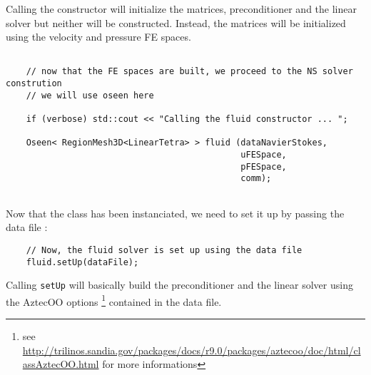 Calling the constructor will initialize the matrices, preconditioner and the linear solver
but neither will be constructed. Instead, the matrices will be initialized using the
velocity and pressure FE spaces.

\begin{verbatim}

    // now that the FE spaces are built, we proceed to the NS solver constrution
    // we will use oseen here

    if (verbose) std::cout << "Calling the fluid constructor ... ";

    Oseen< RegionMesh3D<LinearTetra> > fluid (dataNavierStokes,
                                              uFESpace,
                                              pFESpace,
                                              comm);


\end{verbatim}

Now that the class has been instanciated, we need to set it up by passing the data file :

\begin{verbatim}
    // Now, the fluid solver is set up using the data file
    fluid.setUp(dataFile);
\end{verbatim}

Calling \verb|setUp|
will basically build the preconditioner and the linear solver using the AztecOO options \footnote{see \url{http://trilinos.sandia.gov/packages/docs/r9.0/packages/aztecoo/doc/html/classAztecOO.html} for more informations }
contained in the data file.

